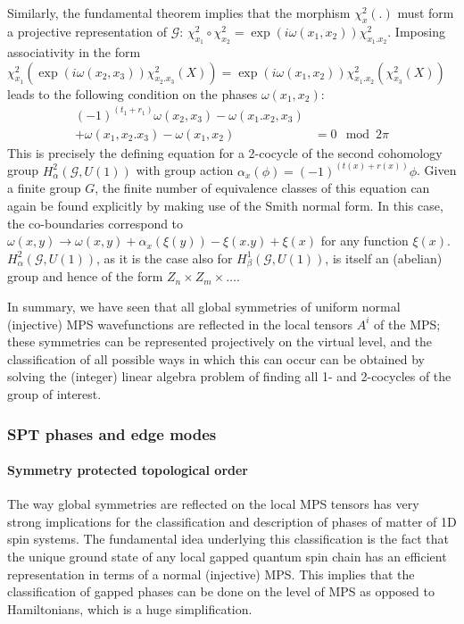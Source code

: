 \documentclass[rmp,aps,reprint,superscriptaddress,nobalancelastpage]{revtex4-1}
\begin{document}
Similarly, the fundamental theorem implies that the morphism $\chi^2_x(.)$ must form a projective representation of $\mathcal{G}$: $\chi^2_{x_1}\circ \chi^2_{x_2}=\exp(i\omega(x_1,x_2))\chi^2_{x_1.x_2}$. Imposing associativity in the form $\chi^2_{x_1}\left(\exp(i\omega(x_2,x_3))\chi^2_{x_2.x_3}(X)\right)=\exp(i\omega(x_1,x_2))\chi^2_{x_1.x_2}\left(\chi^2_{x_3}(X)\right)$ leads to the following condition on the phases $\omega(x_1,x_2)$:
\begin{align*}
    (-1)^{(t_1+r_1)}\omega(x_2,x_3)-\omega(x_1.x_2,x_3) &             \\
    +\omega(x_1,x_2.x_3)-\omega(x_1,x_2)                & =0\mod 2\pi
\end{align*}
This is precisely the defining equation for a 2-cocycle of the second cohomology group $H^2_\alpha(\mathcal{G},U(1))$ with group action $\alpha_x(\phi)=(-1)^{(t(x)+r(x))}\phi$. Given a finite group $G$, the finite number of equivalence classes of this equation can again be found explicitly by making use of the Smith normal form. In this case, the co-boundaries correspond to $\omega(x,y)\rightarrow \omega(x,y)+\alpha_x(\xi(y))-\xi(x.y)+\xi(x)$ for any function $\xi(x)$. $H^2_\alpha(\mathcal{G},U(1))$, as it is the case also for $H^1_\beta(\mathcal{G},U(1))$, is itself an (abelian) group and hence of the form $Z_n\times Z_m\times \dots$.


In summary, we have seen that all global symmetries of uniform normal (injective) MPS wavefunctions are reflected in the local tensors $A^i$ of the MPS; these symmetries can be represented projectively on the virtual level, and the classification of all possible ways in which this can occur can be obtained by solving the (integer) linear algebra problem of finding all 1- and 2-cocycles of the group of interest.


\subsubsection{SPT phases and edge modes\label{sec:3:1D-SPT}}
\paragraph{Symmetry protected topological order}

The way global symmetries are reflected on the local MPS tensors has very strong implications for the classification and description of phases of matter of 1D spin systems. The fundamental idea underlying this classification is the fact that the unique ground state of any local gapped quantum spin chain has an efficient representation in terms of a normal (injective) MPS.  This implies that the classification of gapped phases can be done  on the level of MPS as opposed to Hamiltonians, which is a huge simplification.
\end{document}
